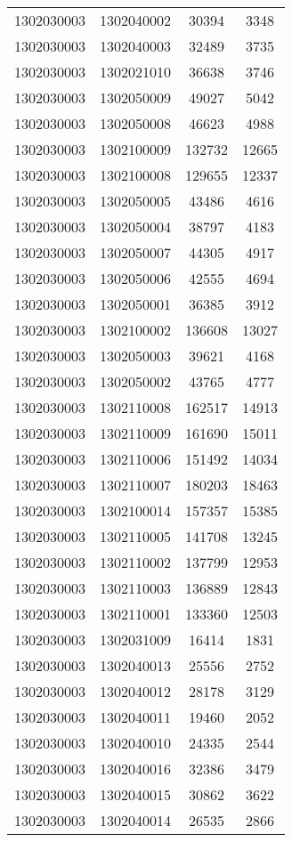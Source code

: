 \begin{longtable}[h]{llcc}
		1302030003 & 1302040002 & 30394 & 3348\\
		1302030003 & 1302040003 & 32489 & 3735\\
		1302030003 & 1302021010 & 36638 & 3746\\
		1302030003 & 1302050009 & 49027 & 5042\\
		1302030003 & 1302050008 & 46623 & 4988\\
		1302030003 & 1302100009 & 132732 & 12665\\
		1302030003 & 1302100008 & 129655 & 12337\\
		1302030003 & 1302050005 & 43486 & 4616\\
		1302030003 & 1302050004 & 38797 & 4183\\
		1302030003 & 1302050007 & 44305 & 4917\\
		1302030003 & 1302050006 & 42555 & 4694\\
		1302030003 & 1302050001 & 36385 & 3912\\
		1302030003 & 1302100002 & 136608 & 13027\\
		1302030003 & 1302050003 & 39621 & 4168\\
		1302030003 & 1302050002 & 43765 & 4777\\
		1302030003 & 1302110008 & 162517 & 14913\\
		1302030003 & 1302110009 & 161690 & 15011\\
		1302030003 & 1302110006 & 151492 & 14034\\
		1302030003 & 1302110007 & 180203 & 18463\\
		1302030003 & 1302100014 & 157357 & 15385\\
		1302030003 & 1302110005 & 141708 & 13245\\
		1302030003 & 1302110002 & 137799 & 12953\\
		1302030003 & 1302110003 & 136889 & 12843\\
		1302030003 & 1302110001 & 133360 & 12503\\
		1302030003 & 1302031009 & 16414 & 1831\\
		1302030003 & 1302040013 & 25556 & 2752\\
		1302030003 & 1302040012 & 28178 & 3129\\
		1302030003 & 1302040011 & 19460 & 2052\\
		1302030003 & 1302040010 & 24335 & 2544\\
		1302030003 & 1302040016 & 32386 & 3479\\
		1302030003 & 1302040015 & 30862 & 3622\\
		1302030003 & 1302040014 & 26535 & 2866\\

\end{longtable}
